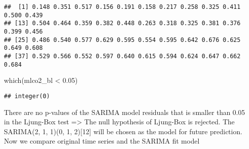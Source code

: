 \documentclass[
]{article}
\newenvironment{Shaded}{\begin{snugshade}}{\end{snugshade}}
\newcommand{\AttributeTok}[1]{\textcolor[rgb]{0.77,0.63,0.00}{#1}}
\newcommand{\ConstantTok}[1]{\textcolor[rgb]{0.00,0.00,0.00}{#1}}
\newcommand{\ControlFlowTok}[1]{\textcolor[rgb]{0.13,0.29,0.53}{\textbf{#1}}}
\newcommand{\DecValTok}[1]{\textcolor[rgb]{0.00,0.00,0.81}{#1}}
\newcommand{\FloatTok}[1]{\textcolor[rgb]{0.00,0.00,0.81}{#1}}
\newcommand{\FunctionTok}[1]{\textcolor[rgb]{0.00,0.00,0.00}{#1}}
\newcommand{\NormalTok}[1]{#1}
\newcommand{\OtherTok}[1]{\textcolor[rgb]{0.56,0.35,0.01}{#1}}
\newcommand{\SpecialCharTok}[1]{\textcolor[rgb]{0.00,0.00,0.00}{#1}}
\newcommand{\StringTok}[1]{\textcolor[rgb]{0.31,0.60,0.02}{#1}}
\begin{document}
\begin{Shaded}
\end{Shaded}

\begin{verbatim}
##  [1] 0.148 0.351 0.517 0.156 0.191 0.158 0.217 0.258 0.325 0.411 0.500 0.439
## [13] 0.504 0.464 0.359 0.382 0.448 0.263 0.318 0.325 0.381 0.376 0.399 0.456
## [25] 0.486 0.540 0.577 0.629 0.595 0.554 0.595 0.642 0.676 0.625 0.649 0.608
## [37] 0.529 0.566 0.552 0.597 0.640 0.615 0.594 0.624 0.647 0.662 0.684
\end{verbatim}

\begin{Shaded}
\begin{Highlighting}[]
\FunctionTok{which}\NormalTok{(mlco2\_bl }\SpecialCharTok{\textless{}} \FloatTok{0.05}\NormalTok{)}
\end{Highlighting}
\end{Shaded}

\begin{verbatim}
## integer(0)
\end{verbatim}

There are no p-values of the SARIMA model residuals that is smaller than
0.05 in the Ljung-Box test =\textgreater{} The null hypothesis of
Ljung-Box is rejected. The SARIMA(2, 1, 1)(0, 1, 2){[}12{]} will be
chosen as the model for future prediction. Now we compare original time
series and the SARIMA fit model
\end{document}
